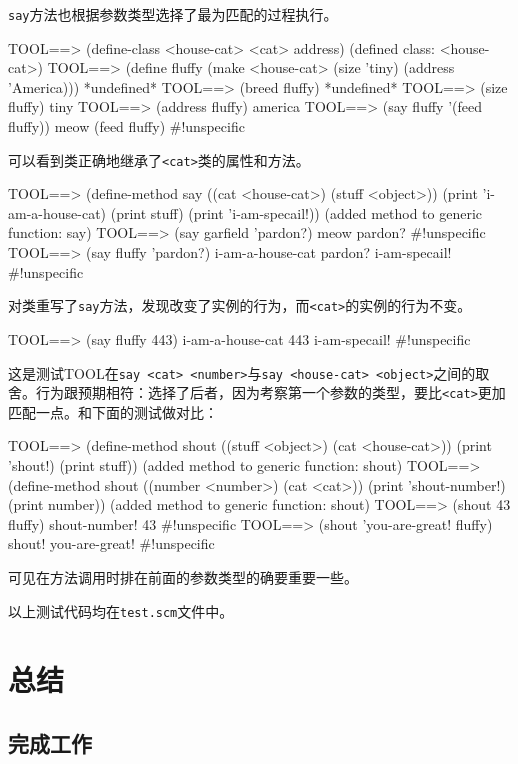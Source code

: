 \documentclass[a4paper]{article}
\newcommand{\code}[1]{\mbox{\tt #1}}
\begin{document}
\code{say}方法也根据参数类型选择了最为匹配的过程执行。

\beginlisp
TOOL==> (define-class <house-cat> <cat> address)
(defined class: <house-cat>)
\null
TOOL==> (define fluffy (make <house-cat> (size 'tiny) (address 'America)))
*undefined*
\null
TOOL==> (breed fluffy)
*undefined*
\null
TOOL==> (size fluffy)
tiny
\null
TOOL==> (address fluffy)
america
\null
TOOL==> (say fluffy '(feed fluffy))
meow
(feed fluffy)
\#!unspecific
\null
\endlisp

可以看到\code{<house-cat>}类正确地继承了\code{<cat>}类的属性和方法。

\beginlisp
TOOL==> (define-method say ((cat <house-cat>) (stuff <object>))
  (print 'i-am-a-house-cat)
  (print stuff)
  (print 'i-am-specail!))
(added method to generic function: say)
\null
TOOL==> (say garfield 'pardon?)
meow
pardon?
\#!unspecific
\null
TOOL==> (say fluffy 'pardon?)
i-am-a-house-cat
pardon?
i-am-specail!
\#!unspecific
\null
\endlisp

对\code{<house-cat>}类重写了\code{say}方法，发现改变了\code{<house-cat>}实例的行为，而\code{<cat>}的实例的行为不变。

\beginlisp
TOOL==> (say fluffy 443)
i-am-a-house-cat
443
i-am-specail!
\#!unspecific
\null
\endlisp

这是测试TOOL在\code{say <cat> <number>}与\code{say <house-cat> <object>}之间的取舍。行为跟预期相符：选择了后者，因为考察第一个参数的类型，\code{<house-cat>}要比\code{<cat>}更加匹配一点。和下面的测试做对比：

\beginlisp
TOOL==> (define-method shout ((stuff <object>) (cat <house-cat>))
  (print 'shout!)
  (print stuff))
(added method to generic function: shout)
\null
TOOL==> (define-method shout ((number <number>) (cat <cat>))
  (print 'shout-number!)
  (print number))
(added method to generic function: shout)
\null
TOOL==> (shout 43 fluffy)
shout-number!
43
\#!unspecific
\null
TOOL==> (shout 'you-are-great! fluffy)
shout!
you-are-great!
\#!unspecific
\null
\endlisp

可见在方法调用时排在前面的参数类型的确要重要一些。

以上测试代码均在\code{test.scm}文件中。

\section{总结}

\subsection{完成工作}
\end{document}
